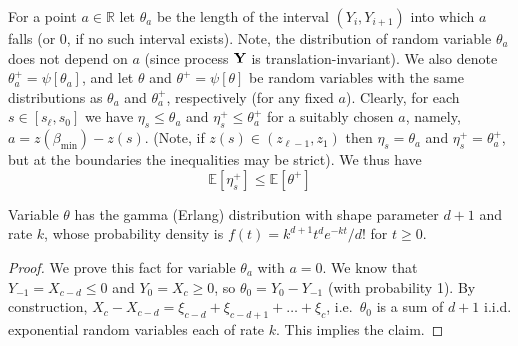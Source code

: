 \documentclass[final,12pt]{colt2018}
\def\bmin{{\beta_{\min}}}
\def\E{{\mathbb E}}
\begin{document}
For a point $a\in\mathbb R$ let $\theta_a$ be the length of the interval $(Y_i,Y_{i+1})$ into which $a$ falls
(or $0$, if no such interval exists). Note,
the distribution of random variable $\theta_a$ does not depend on $a$ (since  process ${\bf Y}$
is translation-invariant). We also denote 
 $\theta^+_a=\psi[\theta_a]$, and let $\theta$ and $\theta^+=\psi[\theta]$ be random variables with the same
distributions as  $\theta_a$ and $\theta^+_a$, respectively (for any fixed $a$).
%
Clearly, for each $s\in[s_\ell,s_0]$ we have $\eta_s\le \theta_a$ and $\eta^+_s\le \theta^+_a$ for a suitably chosen $a$,
namely, $a=z(\bmin)-z(s)$. (Note, if $z(s)\in(z_{\ell-1},z_1)$ then $\eta_s= \theta_a$ and $\eta^+_s= \theta^+_a$,
but at the boundaries the inequalities may be strict).
We thus have
\begin{equation}
\E[\eta^+_s]\le \E[\theta^+]
\label{eq:eta-nu}
\end{equation}

\begin{lemma}\label{lemma:nu-distribution}
Variable $\theta$ has the gamma (Erlang) distribution with shape parameter $d+1$ and rate $k$,
whose probability density is  $f(t)=k^{d+1}t^de^{-kt} / d!$ for $t\ge 0$.
\end{lemma}
\begin{proof}
We prove this fact for variable $\theta_a$ with $a=0$.
We know that $Y_{-1}=X_{c-d}\le 0$ and $Y_0=X_c\ge 0$, so $\theta_0=Y_0-Y_{-1}$ (with probability 1).
By construction, $X_c-X_{c-d}=\xi_{c-d}+\xi_{c-d+1}+\ldots+\xi_{c}$,
i.e.\ $\theta_0$ is a sum of $d+1$ i.i.d. exponential random variables each of rate $k$.
This implies the claim.
\end{proof}

\end{document}
